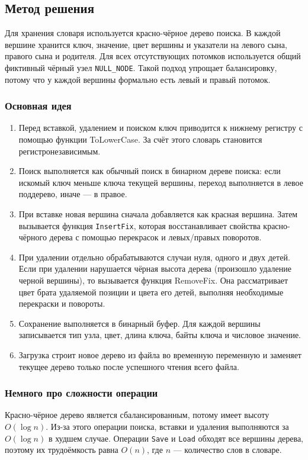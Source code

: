 \documentclass[12pt]{article}
\begin{document}
\subsection*{Метод решения}
\hspace{2ex}
Для хранения словаря используется красно-чёрное дерево поиска. В каждой вершине хранится ключ, значение, цвет вершины и указатели на левого сына, правого сына и родителя. Для всех отсутствующих потомков используется общий фиктивный чёрный узел \texttt{NULL\_NODE}. Такой подход упрощает балансировку, потому что у каждой вершины формально есть левый и правый потомок. \\

\subsubsection*{Основная идея}
\begin{enumerate}
\item Перед вставкой, удалением и поиском ключ приводится к нижнему регистру с помощью функции ToLowerCase. За счёт этого словарь становится регистронезависимым.
\item Поиск выполняется как обычный поиск в бинарном дереве поиска: если искомый ключ меньше ключа текущей вершины, переход выполняется в левое поддерево, иначе — в правое.
\item При вставке новая вершина сначала добавляется как красная вершина. Затем вызывается функция \texttt{InsertFix}, которая восстанавливает свойства красно-чёрного дерева с помощью перекрасок и левых/правых поворотов.
\item При удалении отдельно обрабатываются случаи нуля, одного и двух детей. Если при удалении нарушается чёрная высота дерева (произошло удаление черной вершины), то вызывается функция RemoveFix. Она рассматривает цвет брата удаляемой позиции и цвета его детей, выполняя необходимые перекраски и повороты.
\item Сохранение выполняется в бинарный буфер. Для каждой вершины записывается тип узла, цвет, длина ключа, байты ключа и числовое значение. 
\item Загрузка строит новое дерево из файла во временную переменную и заменяет текущее дерево только после успешного чтения всего файла.
\end{enumerate}

\subsubsection*{Немного про сложности операции}
Красно-чёрное дерево является сбалансированным, потому имеет высоту $O(\log n)$. Из-за этого операции поиска, вставки и удаления выполняются за $O(\log n)$ в худшем случае. Операции \texttt{Save} и \texttt{Load} обходят все вершины дерева, поэтому их трудоёмкость равна $O(n)$, где $n$ — количество слов в словаре.
\end{document}
